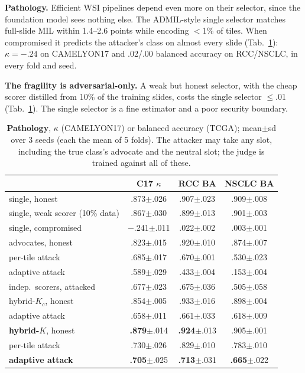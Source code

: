 \documentclass[10pt,twocolumn,letterpaper]{article}
\newcommand{\pmsd}[1]{{\scriptsize$\pm$#1}}
\begin{document}
\textbf{Pathology.} Efficient WSI pipelines depend even more on their selector, since the foundation model sees nothing else. The ADMIL-style single selector matches full-slide MIL within 1.4--2.6 points while encoding $<$1\% of tiles. When compromised it predicts the attacker's class on almost every slide (Tab.~\ref{tab:wsi}): $\kappa=-.24$ on CAMELYON17 and .02/.00 balanced accuracy on RCC/NSCLC, in every fold and seed.

\textbf{The fragility is adversarial-only.} A weak but honest selector, with the cheap scorer distilled from 10\% of the training slides, costs the single selector $\le$.01 (Tab.~\ref{tab:wsi}). The single selector is a fine estimator and a poor security boundary.

\begin{table}[t]\centering
\caption{\textbf{Pathology}, $\kappa$ (CAMELYON17) or balanced accuracy (TCGA); mean\pmsd{sd} over 3 seeds (each the mean of 5 folds). The attacker may take any slot, including the true class's advocate and the neutral slot; the judge is trained against all of these.}\label{tab:wsi}
\setlength{\tabcolsep}{2.5pt}\small
\begin{tabular}{@{}lccc@{}}\toprule
 & C17 $\kappa$ & RCC BA & NSCLC BA\\\midrule
single, honest & .873\pmsd{.026} & .907\pmsd{.023} & .909\pmsd{.008}\\
single, weak scorer (10\% data) & .867\pmsd{.030} & .899\pmsd{.013} & .901\pmsd{.003}\\
single, compromised & $-$.241\pmsd{.011} & .022\pmsd{.002} & .003\pmsd{.001}\\\midrule
advocates, honest & .823\pmsd{.015} & .920\pmsd{.010} & .874\pmsd{.007}\\
\quad per-tile attack & .685\pmsd{.017} & .670\pmsd{.001} & .530\pmsd{.023}\\
\quad adaptive attack & .589\pmsd{.029} & .433\pmsd{.004} & .153\pmsd{.004}\\
indep.\ scorers, attacked & .677\pmsd{.023} & .675\pmsd{.036} & .505\pmsd{.058}\\\midrule
hybrid-$K_c$, honest & .854\pmsd{.005} & .933\pmsd{.016} & .898\pmsd{.004}\\
\quad adaptive attack & .658\pmsd{.011} & .661\pmsd{.033} & .618\pmsd{.009}\\
\textbf{hybrid-$K$}, honest & \textbf{.879}\pmsd{.014} & \textbf{.924}\pmsd{.013} & .905\pmsd{.001}\\
\quad per-tile attack & .730\pmsd{.026} & .829\pmsd{.010} & .783\pmsd{.010}\\
\quad \textbf{adaptive attack} & \textbf{.705}\pmsd{.025} & \textbf{.713}\pmsd{.031} & \textbf{.665}\pmsd{.022}\\\bottomrule
\end{tabular}\end{table}
\end{document}
